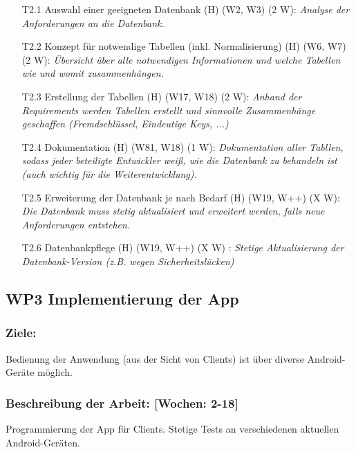 \documentclass{report}
\begin{document}
\begin{enumerate}
\item [T2.1] Auswahl einer geeigneten Datenbank (H) (W2, W3) (2 W): \emph{ Analyse der Anforderungen an die Datenbank.}
\item [T2.2] Konzept für notwendige Tabellen (inkl. Normalisierung) (H) (W6, W7) (2 W): \emph{ Übersicht über alle notwendigen Informationen und welche Tabellen wie und womit zusammenhängen.}
\item [T2.3] Erstellung der Tabellen (H) (W17, W18) (2 W): \emph{ Anhand der Requirements werden Tabellen erstellt und sinnvolle Zusammenhänge geschaffen (Fremdschlüssel, Eindeutige Keys, ...)}
\item [T2.4] Dokumentation (H) (W81, W18) (1 W): \emph{ Dokumentation aller Tabllen, sodass jeder beteiligte Entwickler weiß, wie die Datenbank zu behandeln ist (auch wichtig für die Weiterentwicklung).}
\item [T2.5] Erweiterung der Datenbank je nach Bedarf (H) (W19, W++) (X W): \emph{ Die Datenbank muss stetig aktualisiert und erweitert werden, falls neue Anforderungen entstehen.}
\item [T2.6] Datenbankpflege (H) (W19, W++) (X W) : \emph{ Stetige Aktualisierung der Datenbank-Version (z.B. wegen Sicherheitslücken)}
\end{enumerate}

\subsection*{WP3 Implementierung der App}

\subsubsection{Ziele:} Bedienung der Anwendung (aus der Sicht von Clients) ist über diverse Android-Geräte möglich.
\subsubsection{Beschreibung der Arbeit: [Wochen: 2-18]} Programmierung der App für Clients. Stetige Tests an verschiedenen aktuellen Android-Geräten.
\end{document}

